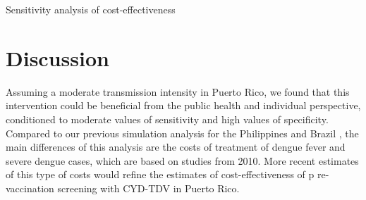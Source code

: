 \documentclass[12pt]{article}
\begin{document}
\begin{table}[ht]
  \centering
  
  \caption{Sensitivity analysis of cost-effectiveness} 
  \label{table-tornado}
\end{table}

\section{Discussion}
Assuming a moderate transmission intensity in Puerto Rico, we found that this intervention could be beneficial from the public health and individual perspective, conditioned to moderate values of sensitivity and high values of specificity. Compared to our previous simulation analysis for the Philippines and Brazil \cite{Espana2019Biorxiv}, the main differences of this analysis are the costs of treatment of dengue fever and severe dengue cases, which are based on studies from 2010. More recent estimates of this type of costs would refine the estimates of cost-effectiveness of p re-vaccination screening with CYD-TDV in Puerto Rico. 

 
 
\end{document}
